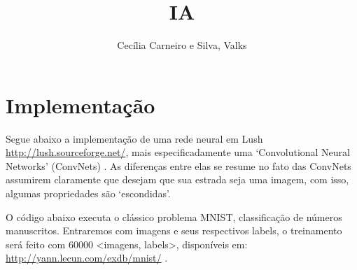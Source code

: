 \documentclass[11pt]{article}
\title{IA}
\author{Cecília Carneiro e Silva, Valks}
\date{}
\begin{document}
\maketitle

\setcounter{tocdepth}{3}
\tableofcontents
\vspace*{1cm}

\section{Implementação}
\label{sec-1}


  Segue abaixo a implementação de uma rede neural em Lush \href{http://lush.sourceforge.net/}{http://lush.sourceforge.net/}, mais especificadamente uma `Convolutional Neural Networks' (ConvNets) . As diferenças entre elas se resume no fato das ConvNets assumirem claramente que desejam que sua estrada seja uma imagem, com isso, algumas propriedades são `escondidas'.

  O código abaixo executa o clássico problema MNIST, classificação de números manuscritos. Entraremos com imagens e seus respectivos labels, o treinamento será feito com 60000 <imagens, labels>, disponíveis em: \href{http://yann.lecun.com/exdb/mnist/}{http://yann.lecun.com/exdb/mnist/} .
  
  
\end{document}
